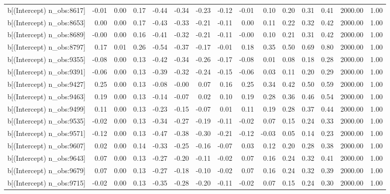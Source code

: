 \begin{table}[ht]
\begin{tabular}{rrrrrrrrrrrrrrr}
  b[(Intercept) n\_obs:8617] & -0.01 & 0.00 & 0.17 & -0.44 & -0.34 & -0.23 & -0.12 & -0.01 & 0.10 & 0.20 & 0.31 & 0.41 & 2000.00 & 1.00 \\ 
  b[(Intercept) n\_obs:8653] & 0.00 & 0.00 & 0.17 & -0.43 & -0.33 & -0.21 & -0.11 & 0.00 & 0.11 & 0.22 & 0.32 & 0.42 & 2000.00 & 1.00 \\ 
  b[(Intercept) n\_obs:8689] & -0.00 & 0.00 & 0.16 & -0.41 & -0.32 & -0.21 & -0.11 & -0.00 & 0.10 & 0.21 & 0.31 & 0.42 & 2000.00 & 1.00 \\ 
  b[(Intercept) n\_obs:8797] & 0.17 & 0.01 & 0.26 & -0.54 & -0.37 & -0.17 & -0.01 & 0.18 & 0.35 & 0.50 & 0.69 & 0.80 & 2000.00 & 1.00 \\ 
  b[(Intercept) n\_obs:9355] & -0.08 & 0.00 & 0.13 & -0.42 & -0.34 & -0.26 & -0.17 & -0.08 & 0.01 & 0.08 & 0.18 & 0.28 & 2000.00 & 1.00 \\ 
  b[(Intercept) n\_obs:9391] & -0.06 & 0.00 & 0.13 & -0.39 & -0.32 & -0.24 & -0.15 & -0.06 & 0.03 & 0.11 & 0.20 & 0.29 & 2000.00 & 1.00 \\ 
  b[(Intercept) n\_obs:9427] & 0.25 & 0.00 & 0.13 & -0.08 & -0.00 & 0.07 & 0.16 & 0.25 & 0.34 & 0.42 & 0.50 & 0.59 & 2000.00 & 1.00 \\ 
  b[(Intercept) n\_obs:9463] & 0.19 & 0.00 & 0.13 & -0.14 & -0.07 & 0.02 & 0.10 & 0.19 & 0.28 & 0.36 & 0.46 & 0.54 & 2000.00 & 1.00 \\ 
  b[(Intercept) n\_obs:9499] & 0.11 & 0.00 & 0.13 & -0.23 & -0.15 & -0.07 & 0.01 & 0.11 & 0.19 & 0.28 & 0.37 & 0.44 & 2000.00 & 1.00 \\ 
  b[(Intercept) n\_obs:9535] & -0.02 & 0.00 & 0.13 & -0.34 & -0.27 & -0.19 & -0.11 & -0.02 & 0.07 & 0.15 & 0.24 & 0.33 & 2000.00 & 1.00 \\ 
  b[(Intercept) n\_obs:9571] & -0.12 & 0.00 & 0.13 & -0.47 & -0.38 & -0.30 & -0.21 & -0.12 & -0.03 & 0.05 & 0.14 & 0.23 & 2000.00 & 1.00 \\ 
  b[(Intercept) n\_obs:9607] & 0.02 & 0.00 & 0.14 & -0.33 & -0.25 & -0.16 & -0.07 & 0.03 & 0.12 & 0.20 & 0.28 & 0.38 & 2000.00 & 1.00 \\ 
  b[(Intercept) n\_obs:9643] & 0.07 & 0.00 & 0.13 & -0.27 & -0.20 & -0.11 & -0.02 & 0.07 & 0.16 & 0.24 & 0.32 & 0.41 & 2000.00 & 1.00 \\ 
  b[(Intercept) n\_obs:9679] & 0.07 & 0.00 & 0.13 & -0.27 & -0.18 & -0.10 & -0.02 & 0.07 & 0.16 & 0.24 & 0.32 & 0.39 & 2000.00 & 1.00 \\ 
  b[(Intercept) n\_obs:9715] & -0.02 & 0.00 & 0.13 & -0.35 & -0.28 & -0.20 & -0.11 & -0.02 & 0.07 & 0.15 & 0.24 & 0.30 & 2000.00 & 1.00 \\ 

\end{tabular}
\end{table}
